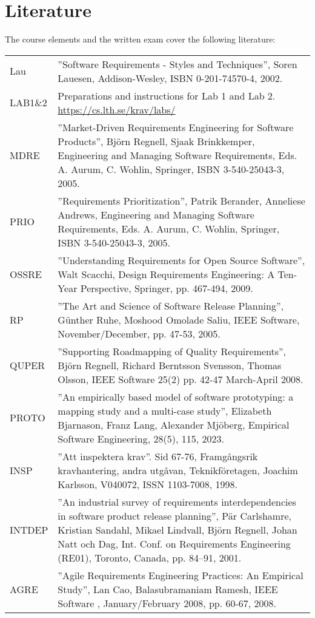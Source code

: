 \documentclass{program}
\begin{document}
\section{Literature}
The course elements and the written exam cover the following literature: 
\begin{flushleft}
\setlength{\tabcolsep}{0pt}
\begin{tabular}{p{} p{}}
Lau & ''Software Requirements - Styles and Techniques'', Soren Lauesen, Addison-Wesley, ISBN 0-201-74570-4, 2002. \\
LAB1\&2	&Preparations and instructions for Lab 1 and Lab 2. \newline \url{https://cs.lth.se/krav/labs/}\\
MDRE &	''Market-Driven Requirements Engineering for Software Products'', Björn Regnell, Sjaak Brinkkemper, Engineering and Managing Software Requirements, Eds. A. Aurum, C. Wohlin, Springer,  ISBN 3-540-25043-3, 2005.\\
PRIO&	''Requirements Prioritization'', Patrik Berander, Anneliese Andrews, Engineering and Managing Software Requirements, Eds. A. Aurum, C. Wohlin, Springer,  ISBN 3-540-25043-3, 2005. \\
OSSRE & ''Understanding Requirements for Open Source Software'', Walt Scacchi, Design Requirements Engineering: A Ten-Year Perspective, Springer, pp. 467-494, 2009.\\
RP&	''The Art and Science of Software Release Planning'', Günther Ruhe, Moshood Omolade Saliu, IEEE Software, November/December, pp. 47-53, 2005. \\
QUPER&	''Supporting Roadmapping of Quality Requirements'', Björn Regnell, Richard Berntsson Svensson, 
Thomas Olsson, IEEE Software 25(2) pp. 42-47 March-April 2008. \\
PROTO& ''An empirically based model of software prototyping: a mapping study and a multi-case study'', Elizabeth Bjarnason, Franz Lang, Alexander Mjöberg, Empirical Software Engineering, 28(5), 115, 2023.\\
INSP&	''Att inspektera krav''. Sid 67-76, Framgångsrik kravhantering, andra utgåvan, Teknikföretagen, Joachim Karlsson, V040072, ISSN 1103-7008, 1998.\\
INTDEP &	''An industrial survey of requirements interdependencies in software product release planning'', Pär Carlshamre, Kristian Sandahl, Mikael Lindvall, Björn Regnell, Johan Natt och Dag, Int. Conf. on Requirements Engineering (RE01), Toronto, Canada, pp. 84–91, 2001.\\
AGRE &	''Agile Requirements Engineering Practices: An Empirical Study'', Lan Cao, Balasubramaniam Ramesh, IEEE Software , January/February 2008, pp. 60-67, 2008.\\
\end{tabular}
\end{flushleft}
\end{document}
